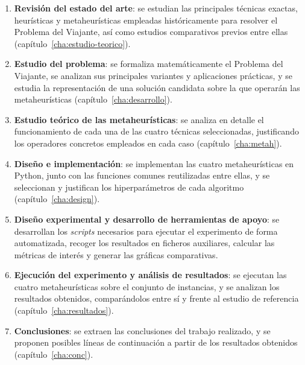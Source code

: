 \begin{enumerate}
  \item \textbf{Revisión del estado del arte}: se estudian las principales técnicas exactas, heurísticas y metaheurísticas
  empleadas históricamente para resolver el Problema del Viajante, así como estudios comparativos previos entre ellas
  (capítulo~\ref{cha:estudio-teorico}).

  \item \textbf{Estudio del problema}: se formaliza matemáticamente el Problema del Viajante, se analizan sus principales
  variantes y aplicaciones prácticas, y se estudia la representación de una solución candidata sobre la que operarán las
  metaheurísticas (capítulo~\ref{cha:desarrollo}).

  \item \textbf{Estudio teórico de las metaheurísticas}: se analiza en detalle el funcionamiento de cada una de las cuatro
  técnicas seleccionadas, justificando los operadores concretos empleados en cada caso
  (capítulo~\ref{cha:metah}).

  \item \textbf{Diseño e implementación}: se implementan las cuatro metaheurísticas en Python, junto con las funciones
  comunes reutilizadas entre ellas, y se seleccionan y justifican los hiperparámetros de cada algoritmo
  (capítulo~\ref{cha:design}).

  \item \textbf{Diseño experimental y desarrollo de herramientas de apoyo}: se desarrollan los \textit{scripts} necesarios
  para ejecutar el experimento de forma automatizada, recoger los resultados en ficheros auxiliares, calcular las métricas 
  de interés y generar las gráficas comparativas.

  \item \textbf{Ejecución del experimento y análisis de resultados}: se ejecutan las cuatro metaheurísticas sobre el
  conjunto de instancias, y se analizan los resultados obtenidos, comparándolos entre sí y frente al estudio
  de referencia (capítulo~\ref{cha:resultados}).

  \item \textbf{Conclusiones}: se extraen las conclusiones del trabajo realizado, y se proponen posibles líneas de
  continuación a partir de los resultados obtenidos (capítulo~\ref{cha:conc}).
\end{enumerate}



